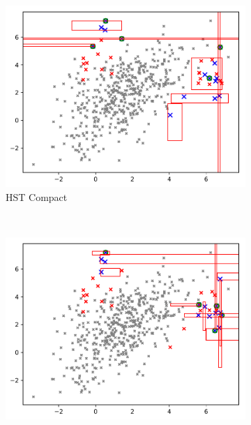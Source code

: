 \documentclass{article} %
\begin{document}
\begin{figure}
    ~ %
    \begin{subfigure}[b]{0.3\textwidth}
    	\includegraphics[width=\textwidth]{leaf_trees/query_compact_ntop5_50_trees_aad_hstrees}
    	\caption{HST Compact}
    	\label{fig:hstrees_compact_rects}
    \end{subfigure}
    ~ %
    \begin{subfigure}[b]{0.3\textwidth}
    	\includegraphics[width=\textwidth]{leaf_trees/query_compact_ntop5_50_trees_aad_rsforest}

\end{subfigure}
\end{figure}
\end{document}
